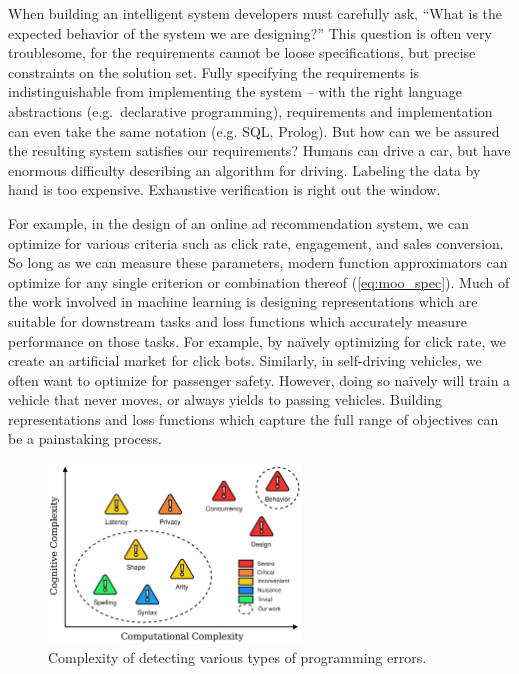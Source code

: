 When building an intelligent system developers must carefully ask, ``What is the expected behavior of the system we are designing?'' This question is often very troublesome, for the requirements cannot be loose specifications, but precise constraints on the solution set. Fully specifying the requirements is indistinguishable from implementing the system -- with the right language abstractions (e.g.\ declarative programming), requirements and implementation can even take the same notation (e.g. SQL, Prolog). But how can we be assured the resulting system satisfies our requirements? Humans can drive a car, but have enormous difficulty describing an algorithm for driving. Labeling the data by hand is too expensive. Exhaustive verification is right out the window.

For example, in the design of an online ad recommendation system, we can optimize for various criteria such as click rate, engagement, and sales conversion. So long as we can measure these parameters, modern function approximators can optimize for any single criterion or combination thereof (\autoref{eq:moo_spec}). Much of the work involved in machine learning is designing representations which are suitable for downstream tasks and loss functions which accurately measure performance on those tasks. For example, by na\"ively optimizing for click rate, we create an artificial market for click bots. Similarly, in self-driving vehicles, we often want to optimize for passenger safety. However, doing so na\"ively will train a vehicle that never moves, or always yields to passing vehicles. Building representations and loss functions which capture the full range of objectives can be a painstaking process.

\begin{figure}
    \centering
    \includegraphics[width=0.60\textwidth]{../figures/verification_complexity.png}
    \caption{Complexity of detecting various types of programming errors.}
    \label{fig:verification_complexity}
\end{figure}

